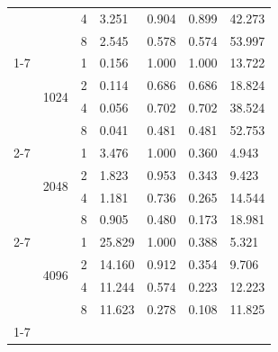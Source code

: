 \begin{table}[H]
\begin{tabular}{lllllll}
 &  & 4 & 3.251 & 0.904 & 0.899 & 42.273 \\
 &  & 8 & 2.545 & 0.578 & 0.574 & 53.997 \\
\cline{1-7} \cline{2-7}
\multirow[t]{12}{*}{Alg. 3 Numba (prange)} & \multirow[t]{4}{*}{1024} & 1 & 0.156 & 1.000 & 1.000 & 13.722 \\
 &  & 2 & 0.114 & 0.686 & 0.686 & 18.824 \\
 &  & 4 & 0.056 & 0.702 & 0.702 & 38.524 \\
 &  & 8 & 0.041 & 0.481 & 0.481 & 52.753 \\
\cline{2-7}
 & \multirow[t]{4}{*}{2048} & 1 & 3.476 & 1.000 & 0.360 & 4.943 \\
 &  & 2 & 1.823 & 0.953 & 0.343 & 9.423 \\
 &  & 4 & 1.181 & 0.736 & 0.265 & 14.544 \\
 &  & 8 & 0.905 & 0.480 & 0.173 & 18.981 \\
\cline{2-7}
 & \multirow[t]{4}{*}{4096} & 1 & 25.829 & 1.000 & 0.388 & 5.321 \\
 &  & 2 & 14.160 & 0.912 & 0.354 & 9.706 \\
 &  & 4 & 11.244 & 0.574 & 0.223 & 12.223 \\
 &  & 8 & 11.623 & 0.278 & 0.108 & 11.825 \\
\cline{1-7} \cline{2-7}
\bottomrule
\end{tabular}
\end{table}
